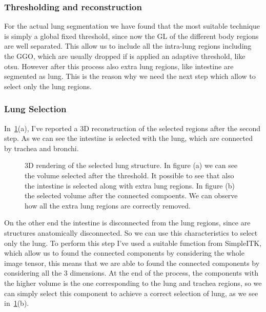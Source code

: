 \documentclass{standalone}
\begin{document}
	

	\subsubsection*{Thresholding and reconstruction}
	
	For the actual lung segmentation we have found that the most suitable technique is simply a global fixed threshold, since now the GL of the different body regions are well separated. This allow us to include all the intra-lung regions including the GGO, which are usually dropped if is applied an adaptive threshold, like otsu.
	However after this process  also extra lung regions, like intestine are segmented as lung. This is the reason why we need the next step which allow to select only the lung regions.
	
	\subsubsection*{Lung Selection}
	
	In \figurename\,\ref{fig:lungSelection}(a), I've reported a 3D reconstruction of the selected regions after the second step. As we can see the intestine is selected with the lung, which are connected by trachea and bronchi. 
	
	
	
	\begin{figure}[h!]
		\centering
		\label{fig:lungSelection}\caption{3D rendering of the selected lung structure. In figure (a) we can see the volume selected after the threshold. It possible to see that also the intestine is selected along with extra lung regions. In figure (b) the selected volume after the connected compoents. We can observe how all the extra lung regions are correctly removed.} 
	\end{figure}
	
	On the other end the intestine is disconnected from the lung regions, since are structures anatomically disconnected. So we can use this characteristics to select only the lung. To perform this step I've used a suitable function from SimpleITK, which allow us to found the connected components by considering the whole image tensor, this means that we are able to found the connected components by considering all the 3 dimensions. At the end of the process, the components with the higher volume is the one corresponding to the lung and trachea regions, so we can simply select this component to achieve a correct selection of lung, as we see in \figurename\,\ref{fig:lungSelection}(b).
	
\end{document}
